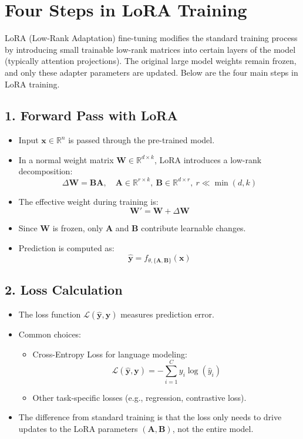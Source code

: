 \documentclass[a4paper, 12pt]{article}
\begin{document}
\section*{Four Steps in LoRA Training}

LoRA (Low-Rank Adaptation) fine-tuning modifies the standard training process by introducing small trainable low-rank matrices into certain layers of the model (typically attention projections). The original large model weights remain frozen, and only these adapter parameters are updated. Below are the four main steps in LoRA training.

\subsection*{1. Forward Pass with LoRA}

\begin{itemize}
    \item Input $\mathbf{x} \in \mathbb{R}^n$ is passed through the pre-trained model.
    \item In a normal weight matrix $\mathbf{W} \in \mathbb{R}^{d \times k}$, LoRA introduces a low-rank decomposition:
    \[
        \Delta \mathbf{W} = \mathbf{B}\mathbf{A}, \quad \mathbf{A} \in \mathbb{R}^{r \times k}, \ \mathbf{B} \in \mathbb{R}^{d \times r}, \ r \ll \min(d, k)
    \]
    \item The effective weight during training is:
    \[
        \mathbf{W}' = \mathbf{W} + \Delta \mathbf{W}
    \]
    \item Since $\mathbf{W}$ is frozen, only $\mathbf{A}$ and $\mathbf{B}$ contribute learnable changes.
    \item Prediction is computed as:
    \[
        \hat{\mathbf{y}} = f_{\theta,\{\mathbf{A}, \mathbf{B}\}}(\mathbf{x})
    \]
\end{itemize}

\subsection*{2. Loss Calculation}

\begin{itemize}
    \item The loss function $\mathcal{L}(\hat{\mathbf{y}}, \mathbf{y})$ measures prediction error.
    \item Common choices:
    \begin{itemize}
        \item Cross-Entropy Loss for language modeling:
        \[
            \mathcal{L}(\hat{\mathbf{y}}, \mathbf{y}) = - \sum_{i=1}^C y_i \log(\hat{y}_i)
        \]
        \item Other task-specific losses (e.g., regression, contrastive loss).
    \end{itemize}
    \item The difference from standard training is that the loss only needs to drive updates to the LoRA parameters $(\mathbf{A}, \mathbf{B})$, not the entire model.
\end{itemize}
\end{document}
